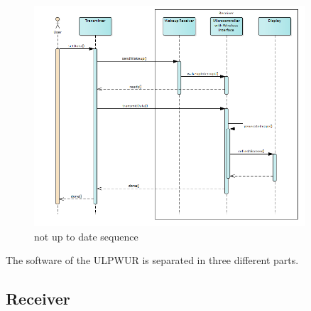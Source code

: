 \begin{figure}[ht]
	\centering
	\includegraphics[width=0.9\textwidth]{4-development/software/graphics/1.png}
	\caption{not up to date sequence\label{software:sequence}}
\end{figure}

The software of the ULPWUR is separated in three different parts. 


\subsection{Receiver}

